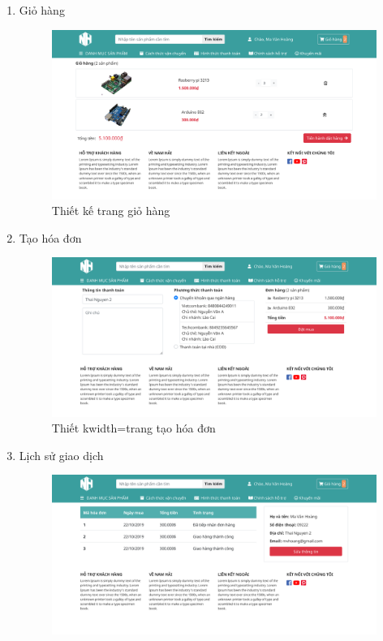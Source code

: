 \begin{enumerate}[label=\textbf{\alph*)}]
\begin{enumerate}[label=\textbf{\alph*)}]
\begin{figure}[h!]
	      \end{figure}
	      \newpage
	\item Giỏ hàng
	      \begin{figure}[h!]
		      \centering
		      \includegraphics[width=\linewidth]{fig/r_cart.png}
		      \caption{Thiết kế trang giỏ hàng}
	      \end{figure}
	\item Tạo hóa đơn
	      \begin{figure}[h!]
		      \centering
		      \includegraphics[width=\linewidth]{fig/r_order.png}
		      \caption{Thiết kwidth= trang tạo hóa đơn}
	      \end{figure}
	      \newpage
	\item Lịch sử giao dịch
	      \begin{figure}[h!]
		      \centering
		      \includegraphics[width=\linewidth]{fig/r_user1.png}

\end{figure}
\end{enumerate}
\end{enumerate}
